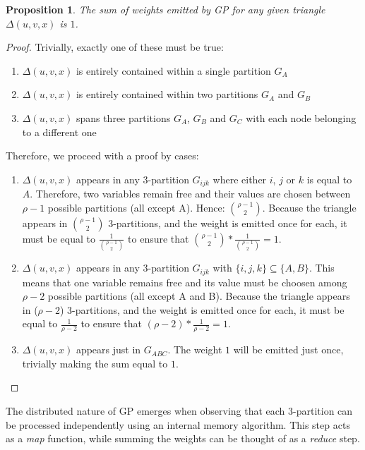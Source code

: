 \documentclass[paper=a4, fontsize=11pt]{scrartcl}
\newtheorem{proposition}{Proposition}
\numberwithin{equation}{section}
\numberwithin{figure}{section}
\numberwithin{table}{section}
\begin{document}
\begin{proposition}
    The sum of weights emitted by GP for any given triangle $\Delta(u, v, x)$ is $1$.
\end{proposition}
\begin{proof}
    Trivially, exactly one of these must be true:
    \begin{enumerate}
        \item $\Delta(u, v, x)$ is entirely contained within a single partition $G_A$
        \item $\Delta(u, v, x)$ is entirely contained within two partitions $G_A$ and $G_B$
        \item $\Delta(u, v, x)$ spans three partitions $G_A$, $G_B$ and $G_C$
        with each node belonging to a different one
    \end{enumerate}
    Therefore, we proceed with a proof by cases:
    \begin{enumerate}
        \item $\Delta(u, v, x)$ appears in any 3-partition $G_{ijk}$ where
        either $i$, $j$ or $k$ is equal to $A$. Therefore, two variables remain
        free and their values are chosen between $\rho-1$ possible partitions
        (all except A). Hence: $\binom{\rho-1}{2}$. Because the triangle appears
        in $\binom{\rho-1}{2}$ 3-partitions, and the weight is emitted once for
        each, it must be equal to $\frac{1}{\binom{\rho-1}{2}}$ to ensure that
        $\binom{\rho-1}{2}* \frac{1}{\binom{\rho-1}{2}} = 1$.

        \item $\Delta(u, v, x)$ appears in any 3-partition $G_{ijk}$ with $\{i,
        j, k\} \subseteq \{A, B\}$. This means that one variable remains free
        and its value must be choosen among $\rho-2$ possible partitions (all
        except A and B). Because the triangle appears in ($\rho-2$)
        3-partitions, and the weight is emitted once for each, it must be equal
        to $\frac{1}{\rho-2}$ to ensure that $(\rho-2)*\frac{1}{\rho-2}=1$.

        \item $\Delta(u, v, x)$ appears just in $G_{ABC}$. The weight $1$ will
        be emitted just once, trivially making the sum equal to $1$.
    \end{enumerate}
\end{proof}

The distributed nature of GP emerges when observing that each 3-partition can be
processed independently using an internal memory algorithm. This step acts
as a \emph{map} function, while summing the weights can be thought of as a
\emph{reduce} step.
\end{document}
